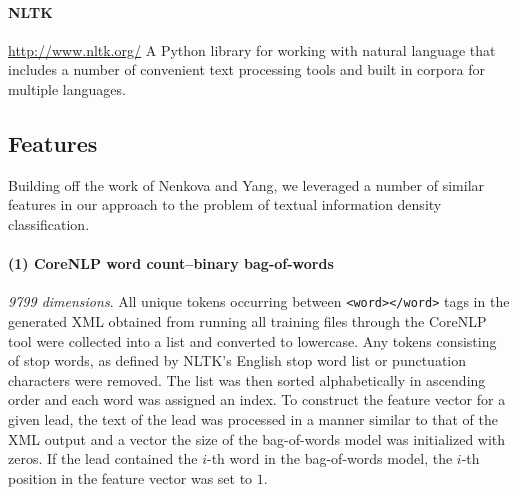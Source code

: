 \documentclass[
10pt, %
a4paper, %
oneside, %
headinclude,footinclude, %
BCOR5mm, %
]{scrartcl}
\begin{document}
\paragraph{\textbf{NLTK}}
\hfill \newline \noindent \url{http://www.nltk.org/} 
\hfill \newline \noindent A Python library for working with natural 
language that includes a number of convenient text processing tools and built 
in corpora for multiple languages.


\subsection{Features}

Building off the work of Nenkova and Yang, we leveraged a number of similar 
features in our approach to the problem of textual information density
classification.

\paragraph{\textbf{(1) CoreNLP word count--binary bag-of-words}}
\hfill \newline \noindent \textit{9799 dimensions}. All unique tokens occurring
between \texttt{<word></word>} tags in the generated XML obtained from running
all training files through the CoreNLP tool were collected into a list
and converted to lowercase. Any tokens consisting of stop words, as defined by
NLTK's English stop word list or punctuation characters were removed. The list
was then sorted alphabetically in ascending order and each word was assigned an
index. To construct the feature vector for a given lead, the text of the lead
was processed in a manner similar to that of the XML output and a vector the
size of the bag-of-words model was initialized with zeros. If the lead contained
the $i$-th word in the bag-of-words model, the $i$-th position in the feature
vector was set to $1$.

\end{document}
